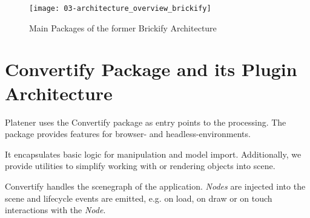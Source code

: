 \documentclass[../ClassicThesis.tex]{subfiles}
\begin{document}
\begin{figure}
  \texttt{[image: 03-architecture\_overview\_brickify]}
  \caption{Main Packages of the former Brickify Architecture}
  \label{fig:architecture_overview_brickify}
\end{figure}


\section{Convertify Package and its Plugin Architecture}

Platener uses the Convertify package as entry points to the {\threedmodel}
processing. The package provides features for browser- and
headless-environments.

It encapsulates basic logic for {\threedmodel} manipulation and model import.
Additionally, we provide utilities to simplify working with \emph{\threejs} or
rendering objects into scene.

Convertify handles the scenegraph of the application. \emph{Nodes} are injected
into the scene  and lifecycle events are emitted, e.g. on
load, on draw or on touch interactions with the \emph{Node}.

\end{document}
